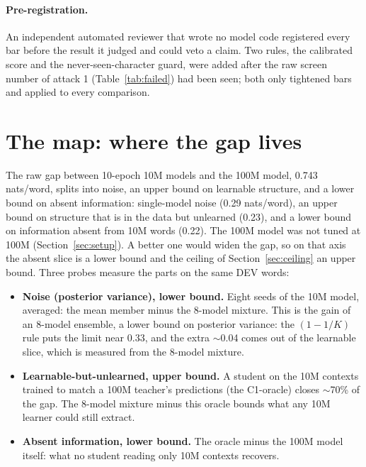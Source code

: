 \documentclass[11pt]{article}
\begin{document}
\paragraph{Pre-registration.} An independent automated reviewer that wrote no model code registered
every bar before the result it judged and could veto a claim. Two rules, the calibrated score and the never-seen-character
guard, were added after the raw screen number of attack 1 (Table~\ref{tab:failed}) had been seen; both only tightened
bars and applied to every comparison.

\section{The map: where the gap lives}
\label{sec:map}
The raw gap between 10-epoch 10M models and the 100M model, 0.743 nats/word, splits into noise, an upper bound on
learnable structure, and a lower bound on absent information: single-model noise (0.29 nats/word), an upper bound on
structure that is in the data but unlearned (0.23), and a lower bound on information absent from 10M words (0.22). The
100M model was not tuned at 100M (Section~\ref{sec:setup}). A better one would widen the gap, so on that axis the
absent slice is a lower bound and the ceiling of Section~\ref{sec:ceiling} an upper bound. Three probes measure the
parts on the same DEV words:
\begin{itemize}
\item \textbf{Noise (posterior variance), lower bound.} Eight seeds of the 10M model, averaged: the mean member minus
  the 8-model mixture. This is the gain of an 8-model ensemble, a lower bound on posterior variance: the $(1 - 1/K)$
  rule puts the limit near 0.33, and the extra $\sim$0.04 comes out of the learnable slice, which is measured from the
  8-model mixture.
\item \textbf{Learnable-but-unlearned, upper bound.} A student on the 10M contexts trained to match a 100M teacher's
  predictions (the C1-oracle) closes $\sim$70\% of the gap. The 8-model mixture minus this oracle bounds what any 10M
  learner could still extract.
\item \textbf{Absent information, lower bound.} The oracle minus the 100M model itself: what no student reading only
  10M contexts recovers.
\end{itemize}
\end{document}

